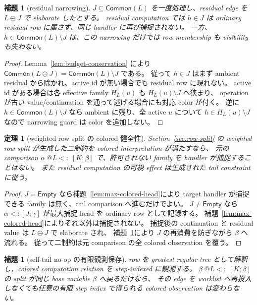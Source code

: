 \documentclass[uplatex,dvipdfmx,a4paper,10.5pt]{jsarticle}
\makeatletter
\theoremstyle{jpplain}
\newtheorem{lemma}[definition]{補題}
\newtheorem{theorem}[definition]{定理}
\newcommand{\Empty}{\mathsf{Empty}}
\newcommand{\Common}{\mathsf{Common}}
\newcommand{\row}[2]{[#1;#2]}
\newcommand{\lsub}[3]{#1\;@#2\mathrel{<:}\;#3}
\makeatother
\begin{document}
\begin{lemma}[residual narrowing]\label{lem:residual-narrowing}
$J\subseteq\Common(L)$ を一度処理し、residual edge を $L\ominus J$ で elaborate したとする。
residual computation では $h\in J$ は ordinary residual row に属さず、同じ handler に再び捕捉されない。
一方、$h\in\Common(L)\setminus J$ は、この narrowing だけでは row membership も visibility も失わない。
\end{lemma}

\begin{proof}
Lemma~\ref{lem:budget-conservation} により
$\Common(L\ominus J)=\Common(L)\setminus J$ である。
従って $h\in J$ はまず ambient residual から除かれ、active id が無い場合でも residual row に現れない。
active id がある場合は各 effective family $H_L(u)$ も $H_L(u)\setminus J$ へ狭まり、
operation が古い value/continuation を通って逃げる場合にも対応 color が付く。
逆に $h\in\Common(L)\setminus J$ なら ambient に残り、全 active $u$ について
$h\in H_L(u)\setminus J$ なので narrowing guard は color を追加しない。
\end{proof}

\begin{theorem}[weighted row split の colored 健全性]\label{thm:colored-row-split}
Section~\ref{sec:row-split} の weighted row split が生成した二制約を colored interpretation が満たすなら、
元の comparison $\lsub{\alpha}{L}{\row{K}{\beta}}$ で、許可されない family を handler が捕捉することはない。
また residual computation の可視 effect は生成された tail constraint に従う。
\end{theorem}

\begin{proof}
$J=\Empty$ なら補題~\ref{lem:max-colored-head}により target handler が捕捉できる family は無く、tail comparison へ進むだけでよい。
$J\neq\Empty$ なら $\alpha<:\row{J}{\gamma}$ が最大捕捉 head を ordinary row として記録する。
補題~\ref{lem:max-colored-head}によりそれ以外は捕捉されない。
捕捉後の continuation と residual value は $L\ominus J$ で elaborate され、
補題~\ref{lem:residual-narrowing}により $J$ の再消費を防ぎながら $\beta$ へ流れる。
従って二制約は元 comparison の全 colored observation を覆う。
\end{proof}

\begin{lemma}[self-tail no-op の有限観測保存]\label{lem:self-tail-colored}
row を greatest regular tree として解釈し、colored computation relation を step-indexed に観測する。
$\lsub{\beta}{L}{\row{K}{\beta}}$ の split が同じ base variable $\beta$ へ戻るだけなら、
その edge を worklist へ再投入しなくても任意の有限 step index で得られる colored observation は変わらない。
\end{lemma}
\end{document}
